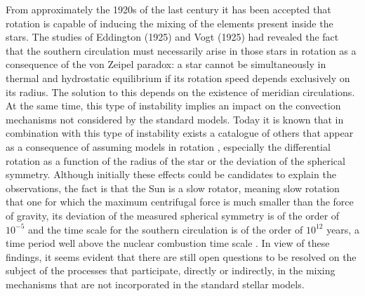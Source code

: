 \documentclass[fleqn,usenatbib]{mnras}
\begin{document}
From approximately the 1920s of the last century it has been accepted that rotation is capable of inducing the mixing of the elements present inside the stars. The studies of Eddington (1925) and Vogt (1925) had revealed the fact that the southern circulation must necessarily arise in those stars in rotation as a consequence of the von Zeipel paradox: a star cannot be simultaneously in thermal and hydrostatic equilibrium if its rotation speed depends exclusively on its radius. The solution to this depends on the existence of meridian circulations. At the same time, this type of instability implies an impact on the convection mechanisms not considered by the standard models. Today it is known that in combination with this type of instability exists a catalogue of others that appear as a consequence of assuming models in rotation \citep{Maeder2003a}, especially the differential rotation as a function of the radius of the star or the deviation of the spherical symmetry. Although initially these effects could be candidates to explain the observations, the fact is that the Sun is a slow rotator, meaning slow rotation that one for which the maximum centrifugal force is much smaller than the force of gravity, its deviation of the measured spherical symmetry is of the order of $10^{-5}$ and the time scale for the southern circulation is of the order of $10^{12}$ years, a time period well above the nuclear combustion time scale \citep{Pinsonneault1997}. In view of these findings, it seems evident that there are still open questions to be resolved on the subject of the processes that participate, directly or indirectly, in the mixing mechanisms that are not incorporated in the standard stellar models.\par
\end{document}
